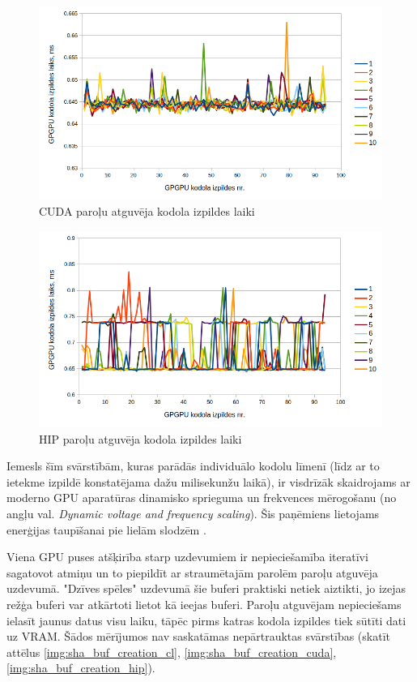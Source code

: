 \begin{figure}[H] \centering
    \includegraphics[width=\textwidth]{images/sha_kernel_exec_cuda.png}
    \caption{CUDA paroļu atguvēja kodola izpildes laiki}
    \label{img:sha_exec_cuda}
\end{figure}

\begin{figure}[H] \centering
    \includegraphics[width=\textwidth]{images/sha_kernel_exec_hip.png}
    \caption{HIP paroļu atguvēja kodola izpildes laiki}
    \label{img:sha_exec_hip}
\end{figure}

Iemesls šīm svārstībām, kuras parādās individuālo kodolu līmenī (līdz ar to
ietekme izpildē konstatējama dažu milisekunžu laikā), ir visdrīzāk skaidrojams
ar moderno GPU aparatūras dinamisko sprieguma un frekvences mērogošanu (no
angļu val. \textit{Dynamic voltage and frequency scaling}). Šis paņēmiens
lietojams enerģijas taupīšanai pie lielām slodzēm \cite{gpu-dvfs}.

Viena GPU puses atšķirība starp uzdevumiem ir nepieciešamība iteratīvi
sagatovot atmiņu un to piepildīt ar straumētajām parolēm paroļu atguvēja
uzdevumā. "Dzīves spēles" uzdevumā šie buferi praktiski netiek aiztikti, jo
izejas režģa buferi var atkārtoti lietot kā ieejas buferi. Paroļu atguvējam
nepieciešams ielasīt jaunus datus visu laiku, tāpēc pirms katras kodola
izpildes tiek sūtīti dati uz VRAM. Šādos mērījumos nav saskatāmas nepārtrauktas
svārstības (skatīt attēlus
\ref{img:sha_buf_creation_cl}, \ref{img:sha_buf_creation_cuda},
\ref{img:sha_buf_creation_hip}).


